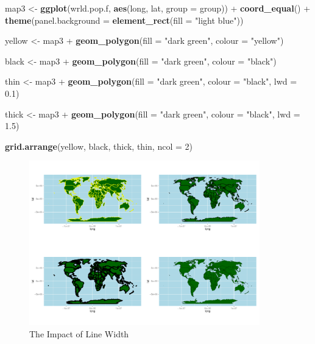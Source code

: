 \documentclass[]{article}
\newenvironment{Shaded}{}{}
\newcommand{\KeywordTok}[1]{\textcolor[rgb]{0.00,0.44,0.13}{\textbf{{#1}}}}
\newcommand{\DataTypeTok}[1]{\textcolor[rgb]{0.56,0.13,0.00}{{#1}}}
\newcommand{\DecValTok}[1]{\textcolor[rgb]{0.25,0.63,0.44}{{#1}}}
\newcommand{\FloatTok}[1]{\textcolor[rgb]{0.25,0.63,0.44}{{#1}}}
\newcommand{\StringTok}[1]{\textcolor[rgb]{0.25,0.44,0.63}{{#1}}}
\newcommand{\NormalTok}[1]{{#1}}
\let\Oldincludegraphics\includegraphics
\renewcommand{\includegraphics}[1]{\Oldincludegraphics[width=10cm]{#1}}
\begin{document}
\begin{Shaded}
\begin{Highlighting}[]
\NormalTok{map3 <- }\KeywordTok{ggplot}\NormalTok{(wrld.pop.f, }\KeywordTok{aes}\NormalTok{(long, lat, }\DataTypeTok{group =} \NormalTok{group)) + }\KeywordTok{coord_equal}\NormalTok{() + }
    \KeywordTok{theme}\NormalTok{(}\DataTypeTok{panel.background =} \KeywordTok{element_rect}\NormalTok{(}\DataTypeTok{fill =} \StringTok{"light blue"}\NormalTok{))}

\NormalTok{yellow <- map3 + }\KeywordTok{geom_polygon}\NormalTok{(}\DataTypeTok{fill =} \StringTok{"dark green"}\NormalTok{, }\DataTypeTok{colour =} \StringTok{"yellow"}\NormalTok{)}

\NormalTok{black <- map3 + }\KeywordTok{geom_polygon}\NormalTok{(}\DataTypeTok{fill =} \StringTok{"dark green"}\NormalTok{, }\DataTypeTok{colour =} \StringTok{"black"}\NormalTok{)}

\NormalTok{thin <- map3 + }\KeywordTok{geom_polygon}\NormalTok{(}\DataTypeTok{fill =} \StringTok{"dark green"}\NormalTok{, }\DataTypeTok{colour =} \StringTok{"black"}\NormalTok{, }\DataTypeTok{lwd =} \FloatTok{0.1}\NormalTok{)}

\NormalTok{thick <- map3 + }\KeywordTok{geom_polygon}\NormalTok{(}\DataTypeTok{fill =} \StringTok{"dark green"}\NormalTok{, }\DataTypeTok{colour =} \StringTok{"black"}\NormalTok{, }\DataTypeTok{lwd =} \FloatTok{1.5}\NormalTok{)}

\KeywordTok{grid.arrange}\NormalTok{(yellow, black, thick, thin, }\DataTypeTok{ncol =} \DecValTok{2}\NormalTok{)}
\end{Highlighting}
\end{Shaded}
\begin{figure}[htbp]
\centering
\includegraphics{figs/The_Impact_of_Line_Width}
\caption{The Impact of Line Width} \label{flinew}
\end{figure}
\end{document}

